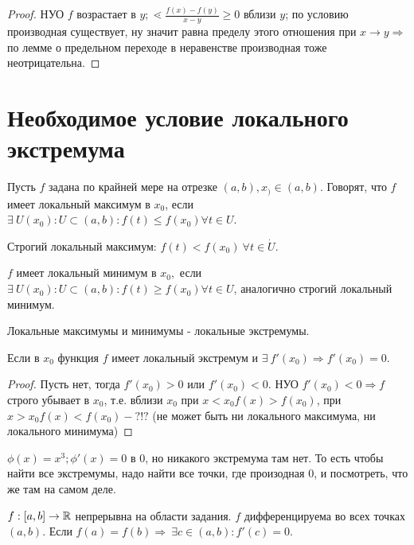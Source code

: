 \documentclass[12pt]{report}
\begin{document}
\begin{proof}
НУО $f$ возрастает в $y; \lessdot \frac{f(x) - f(y)}{x - y} \ge 0$ вблизи $y$; по условию производная существует, ну значит равна пределу этого отношения при $x \to y \Rightarrow$ по лемме о предельном переходе в неравенстве производная тоже неотрицательна.
\end{proof}

\section{Необходимое условие локального экстремума}

\begin{defn}
Пусть $f$ задана по крайней мере на отрезке $(a, b), x_) \in (a, b)$. Говорят, что $f$ имеет локальный максимум в $x_0$, если $\exists ~U(x_0): U \subset (a, b): f(t) \le f(x_0) \forall t \in U$.

Строгий локальный максимум: $f(t) < f(x_0) ~\forall t \in \dot U$.

$f$ имеет локальный минимум в $x_0,$ если $\exists ~U(x_0): U \subset (a, b): f(t) \ge f(x_0) \forall t \in U$, аналогично строгий локальный минимум.

Локальные максимумы и минимумы - локальные экстремумы.
\end{defn}

\begin{thm}
Если в $x_0$ функция $f$ имеет локальный экстремум и $\exists ~f'(x_0) \Rightarrow f'(x_0) = 0$.
\end{thm}
\begin{proof}
Пусть нет, тогда $f'(x_0) > 0$ или $f'(x_0) < 0$. НУО $f'(x_0) < 0 \Rightarrow f$ строго убывает в $x_0$, т.е. вблизи $x_0$ при $x < x_0 f(x) > f(x_0)$, при $x > x_0 f(x) < f(x_0) - ?!?$ (не может быть ни локального максимума, ни локального минимума) 
\end{proof}

\begin{ex}
$\phi(x) = x^3; \phi'(x) = 0$ в $0$, но никакого экстремума там нет. То есть чтобы найти все экстремумы, надо найти все точки, где произодная $0$, и посмотреть, что же там на самом деле.
\end{ex}

\begin{thm}[Ролля]
$f: [a, b] \to \mathbb{R}$ непрерывна на области задания. $f$ дифференцируема во всех точках $(a, b)$. Если $f(a) = f(b) \Rightarrow ~\exists c \in (a, b): f'(c) = 0$.
\end{thm}
\end{document}
